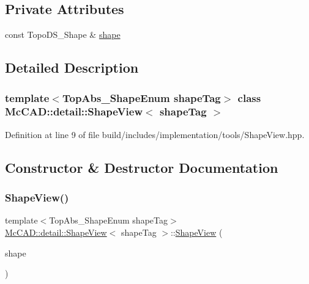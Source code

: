 \subsection*{Private Attributes}
\begin{DoxyCompactItemize}
\item 
const Topo\+D\+S\+\_\+\+Shape \& \hyperlink{classMcCAD_1_1detail_1_1ShapeView_a1bb072976e70ad902ce623a53783c531}{shape}
\end{DoxyCompactItemize}


\subsection{Detailed Description}
\subsubsection*{template$<$Top\+Abs\+\_\+\+Shape\+Enum shape\+Tag$>$\newline
class Mc\+C\+A\+D\+::detail\+::\+Shape\+View$<$ shape\+Tag $>$}



Definition at line 9 of file build/includes/implementation/tools/\+Shape\+View.\+hpp.



\subsection{Constructor \& Destructor Documentation}
\mbox{\label{classMcCAD_1_1detail_1_1ShapeView_a8d438ce001926e69285a3096088be6a4}} 
\subsubsection{\texorpdfstring{Shape\+View()}{ShapeView()}\hspace{0.1cm}{\footnotesize\ttfamily [1/2]}}
{\footnotesize\ttfamily template$<$Top\+Abs\+\_\+\+Shape\+Enum shape\+Tag$>$ \\
\hyperlink{classMcCAD_1_1detail_1_1ShapeView}{Mc\+C\+A\+D\+::detail\+::\+Shape\+View}$<$ shape\+Tag $>$\+::\hyperlink{classMcCAD_1_1detail_1_1ShapeView}{Shape\+View} (\begin{DoxyParamCaption}\item[{const Topo\+D\+S\+\_\+\+Shape \&}]{shape }\end{DoxyParamCaption})}

